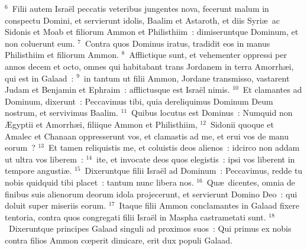 ${}^{6}$~Filii autem Isra\"el peccatis veteribus jungentes nova, fecerunt malum in conspectu Domini, et servierunt idolis, Baalim et Astaroth, et diis Syri\ae\ ac Sidonis et Moab et filiorum Ammon et Philisthiim~: dimiseruntque Dominum, et non coluerunt eum.
${}^{7}$~Contra quos Dominus iratus, tradidit eos in manus Philisthiim et filiorum Ammon.
${}^{8}$~Afflictique sunt, et vehementer oppressi per annos decem et octo, omnes qui habitabant trans Jordanem in terra Amorrh\ae i, qui est in Galaad~:
${}^{9}$~in tantum ut filii Ammon, Jordane transmisso, vastarent Judam et Benjamin et Ephraim~: afflictusque est Isra\"el nimis.
${}^{10}$~Et clamantes ad Dominum, dixerunt~: Peccavimus tibi, quia dereliquimus Dominum Deum nostrum, et servivimus Baalim.
${}^{11}$~Quibus locutus est Dominus~: Numquid non \AE gyptii et Amorrh\ae i, filiique Ammon et Philisthiim,
${}^{12}$~Sidonii quoque et Amalec et Chanaan oppresserunt vos, et clamastis ad me, et erui vos de manu eorum~?
${}^{13}$~Et tamen reliquistis me, et coluistis deos alienos~: idcirco non addam ut ultra vos liberem~:
${}^{14}$~ite, et invocate deos quos elegistis~: ipsi vos liberent in tempore angusti\ae .
${}^{15}$~Dixeruntque filii Isra\"el ad Dominum~: Peccavimus, redde tu nobis quidquid tibi placet~: tantum nunc libera nos.
${}^{16}$~Qu\ae\ dicentes, omnia de finibus suis alienorum deorum idola projecerunt, et servierunt Domino Deo~: qui doluit super miseriis eorum.
${}^{17}$~Itaque filii Ammon conclamantes in Galaad fixere tentoria, contra quos congregati filii Isra\"el in Maspha castrametati sunt.
${}^{18}$~Dixeruntque principes Galaad singuli ad proximos suos~: Qui primus ex nobis contra filios Ammon cœperit dimicare, erit dux populi Galaad.


